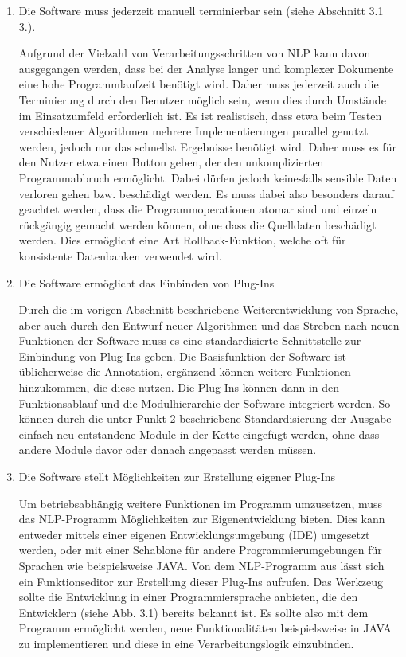 \documentclass[12pt]{report}
\begin{document}
\begin{enumerate}
\item Die Software muss jederzeit manuell terminierbar sein (siehe Abschnitt 3.1 3.).

Aufgrund der Vielzahl von Verarbeitungsschritten von NLP kann davon ausgegangen werden, dass bei der Analyse langer und komplexer Dokumente eine hohe Programmlaufzeit benötigt wird. Daher muss jederzeit auch die Terminierung durch den Benutzer möglich sein, wenn dies durch Umstände im Einsatzumfeld erforderlich ist. Es ist realistisch, dass etwa beim Testen verschiedener Algorithmen mehrere Implementierungen parallel genutzt werden, jedoch nur das schnellst Ergebnisse benötigt wird. 
Daher muss es für den Nutzer etwa einen Button geben, der den unkomplizierten Programmabbruch ermöglicht. Dabei dürfen jedoch keinesfalls sensible Daten verloren gehen bzw. beschädigt werden. 
Es muss dabei also besonders darauf geachtet werden, dass die Programmoperationen atomar sind und einzeln rückgängig gemacht werden können, ohne dass die Quelldaten beschädigt werden. Dies ermöglicht eine Art Rollback-Funktion, welche oft für konsistente Datenbanken verwendet wird.

\item Die Software ermöglicht das Einbinden von Plug-Ins

Durch die im vorigen Abschnitt beschriebene Weiterentwicklung von Sprache, aber auch durch den Entwurf neuer Algorithmen und das Streben nach neuen Funktionen der Software muss es eine standardisierte Schnittstelle zur Einbindung von Plug-Ins geben. Die Basisfunktion der Software ist üblicherweise die Annotation, ergänzend können weitere Funktionen hinzukommen, die diese nutzen. Die Plug-Ins können dann in den Funktionsablauf und die Modulhierarchie der Software integriert werden. So können durch die unter Punkt 2 beschriebene Standardisierung der Ausgabe einfach neu entstandene Module in der Kette eingefügt werden, ohne dass andere Module davor oder danach angepasst werden müssen.

\item Die Software stellt Möglichkeiten zur Erstellung eigener Plug-Ins

Um betriebsabhängig weitere Funktionen im Programm umzusetzen, muss das NLP-Programm Möglichkeiten zur Eigenentwicklung bieten. Dies kann entweder mittels einer eigenen Entwicklungsumgebung (IDE) umgesetzt werden, oder mit einer Schablone für andere Programmierumgebungen für Sprachen wie beispielsweise JAVA. Von dem NLP-Programm aus lässt sich ein Funktionseditor zur Erstellung dieser Plug-Ins aufrufen. Das Werkzeug sollte die Entwicklung in einer Programmiersprache anbieten, die den Entwicklern (siehe Abb. 3.1) bereits bekannt ist. Es sollte also mit dem Programm ermöglicht werden, neue Funktionalitäten beispielsweise in JAVA zu implementieren und diese in eine Verarbeitungslogik einzubinden.


\end{enumerate}
\end{document}
